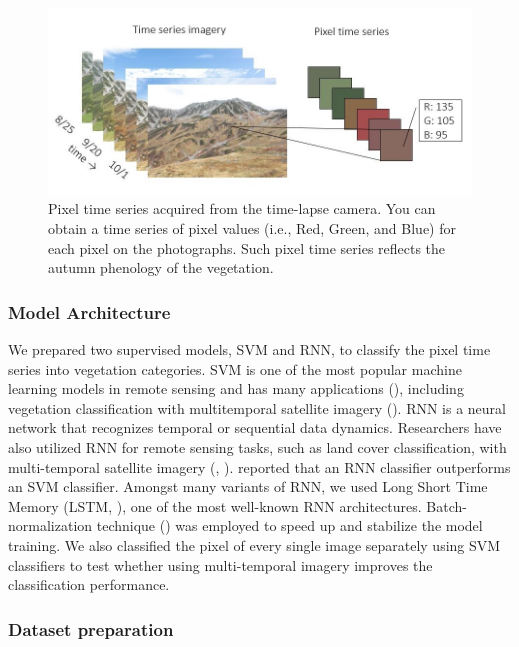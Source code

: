 \documentclass{article}
\begin{document}
\begin{figure}
\includegraphics[width=1\linewidth]{paper_files/figures/Slide1} \caption{Pixel time series acquired from the time-lapse camera. You can obtain a time series of pixel values (i.e., Red, Green, and Blue) for each pixel on the photographs. Such pixel time series reflects the autumn phenology of the vegetation.}\label{fig:pixtimeseries}
\end{figure}

\hypertarget{model-architecture}{%
\subsubsection{Model Architecture}\label{model-architecture}}

We prepared two supervised models, SVM and RNN, to classify the pixel time series into vegetation categories. SVM is one of the most popular machine learning models in remote sensing and has many applications (\cite{Mountrakis2011SVMReview}), including vegetation classification with multitemporal satellite imagery (\cite{Tigges2013RemSenEnv}). RNN is a neural network that recognizes temporal or sequential data dynamics. Researchers have also utilized RNN for remote sensing tasks, such as land cover classification, with multi-temporal satellite imagery (\cite{Ienco2017RemSenLSTM}, \cite{Sharma2018NN}). \cite{Ienco2017RemSenLSTM} reported that an RNN classifier outperforms an SVM classifier. Amongst many variants of RNN, we used Long Short Time Memory (LSTM, \cite{Hochreiter1997LSTM}), one of the most well-known RNN architectures. Batch-normalization technique (\cite{IoffeSzegedy2015BatchNorm}) was employed to speed up and stabilize the model training. We also classified the pixel of every single image separately using SVM classifiers to test whether using multi-temporal imagery improves the classification performance.

\hypertarget{dataset-preparation}{%
\subsubsection{Dataset preparation}\label{dataset-preparation}}
\end{document}
